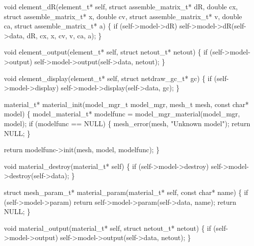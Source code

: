 void element_dR(element_t* self, struct assemble_matrix_t* dR,
                double cx, struct assemble_matrix_t* x,
                double cv, struct assemble_matrix_t* v,
                double ca, struct assemble_matrix_t* a)
\{
    if (self->model->dR)
        self->model->dR(self->data, dR, cx, x, cv, v, ca, a);
\}

\nwendcode{}\nwdocspar

\nwenddocs{}\plusendmoddef
void element_output(element_t* self, struct netout_t* netout)
\{
    if (self->model->output)
        self->model->output(self->data, netout);
\}

void element_display(element_t* self, struct netdraw_gc_t* gc)
\{
    if (self->model->display)
        self->model->display(self->data, gc);
\}

\nwendcode{}\nwdocspar

\nwenddocs{}\plusendmoddef
material_t* material_init(model_mgr_t model_mgr,
                          mesh_t mesh, const char* model)
\{
    model_material_t* modelfunc = model_mgr_material(model_mgr, model);
    if (modelfunc == NULL) \{
        mesh_error(mesh, "Unknown model");
        return NULL;
    \}

    return modelfunc->init(mesh, model, modelfunc);
\}

void material_destroy(material_t* self)
\{
    if (self->model->destroy)
        self->model->destroy(self->data);
\}

\nwendcode{}\nwdocspar

\nwenddocs{}\plusendmoddef
struct mesh_param_t* material_param(material_t* self, const char* name)
\{
    if (self->model->param)
        return self->model->param(self->data, name);
    return NULL;
\}

\nwendcode{}\nwdocspar

\nwenddocs{}\plusendmoddef
void material_output(material_t* self, struct netout_t* netout)
\{
    if (self->model->output)
        self->model->output(self->data, netout);
\}


